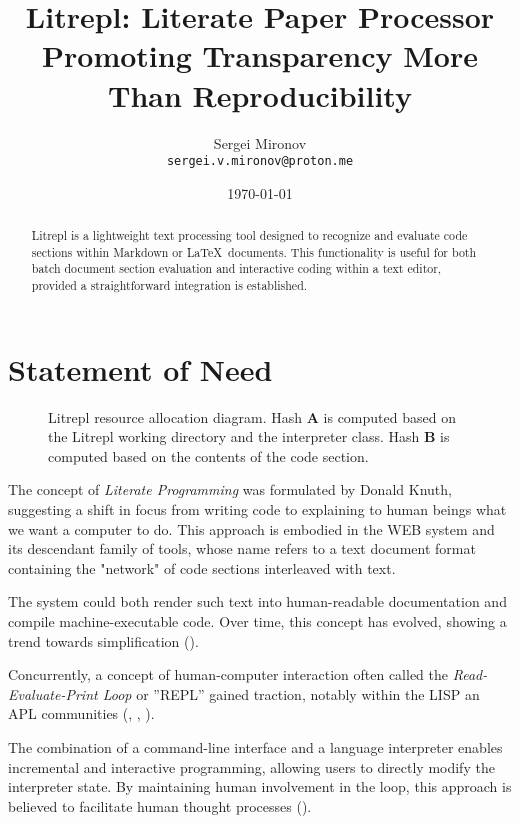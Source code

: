 \documentclass[letterpaper,12pt,twocolumn]{article}
\title{Litrepl: Literate Paper Processor Promoting Transparency More Than Reproducibility}
\author{Sergei Mironov \\
        \texttt{sergei.v.mironov@proton.me}}
\date{\today}
\newcommand{\Latex}{\LaTeX\ }
\begin{document}
\maketitle

\begin{abstract}

Litrepl is a lightweight text processing tool designed to recognize and evaluate
code sections within Markdown or \Latex documents. This functionality is useful
for both batch document section evaluation and interactive coding within a text
editor, provided a straightforward integration is established.

\end{abstract}

\section{Statement of Need}

\begin{figure*}[!hbt]
  \centering
  
  \caption{Litrepl resource allocation diagram. Hash \textbf{A} is computed
  based on the Litrepl working directory and the interpreter class. Hash
  \textbf{B} is computed based on the contents of the code section.}
  \label{fig:resource-allocation}
\end{figure*}

The concept of \textit{Literate Programming} was formulated by Donald Knuth,
suggesting a shift in focus from writing code to explaining to human beings what
we want a computer to do. This approach is embodied in the WEB
system\cite{Knuth1984lp} and its descendant family of tools, whose name refers
to a text document format containing the "network" of code sections interleaved
with text.

The system could both render such text into human-readable documentation and
compile machine-executable code. Over time, this concept has evolved, showing a
trend towards simplification (\textcite{Ramsey1994lps}).

Concurrently, a concept of human-computer interaction often called the
\textit{Read-Evaluate-Print Loop} or ''REPL'' gained traction, notably within
the LISP an APL communities (\textcite{Spence1975apl},
\textcite{McCarthy1959recfun}, \textcite{Iverson1962apl}).

The combination of a command-line interface and a language interpreter enables
incremental and interactive programming, allowing users to directly modify the
interpreter state. By maintaining human involvement in the loop, this approach
is believed to facilitate human thought processes (\textcite{Granger2021litcomp}).
\end{document}
